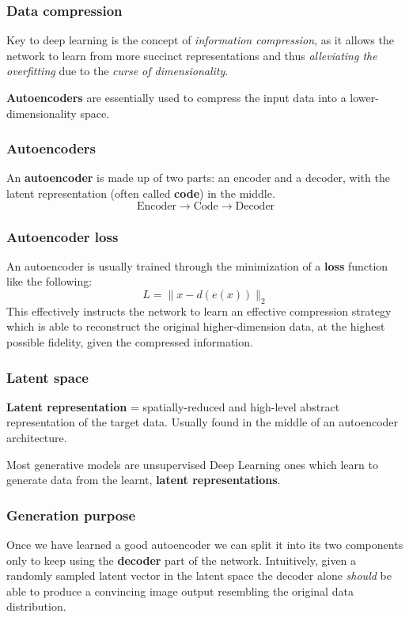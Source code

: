 \begin{frame}
    \frametitle{Data compression}
    Key to deep learning is the concept of \emph{information compression}, as it allows the network to learn from more succinct representations and thus \emph{alleviating the overfitting} due to the \emph{curse of dimensionality}.

    \textbf{Autoencoders} are essentially used to compress the input data into a lower-dimensionality space.
\end{frame}

\begin{frame}
    \frametitle{Autoencoders}
    An \textbf{autoencoder} is made up of two parts: an encoder and a decoder, with the latent representation (often called \textbf{code}) in the middle.
    $$\text{Encoder} \to \text{Code} \to \text{Decoder}$$
\end{frame}

\begin{frame}
    \frametitle{Autoencoder loss}
    An autoencoder is usually trained through the minimization of a \textbf{loss} function like the following:
    $$L=\lVert x - d(e(x)) \rVert_2$$
    This effectively instructs the network to learn an effective compression strategy which is able to reconstruct the original higher-dimension data, at the highest possible fidelity, given the compressed information.
\end{frame}

\begin{frame}
    \frametitle{Latent space}
    \textbf{Latent representation} = spatially-reduced and high-level abstract representation of the target data. Usually found in the middle of an autoencoder architecture.

    Most generative models are unsupervised Deep Learning ones which learn to generate data from the learnt, \textbf{latent representations}.
\end{frame}

\begin{frame}
    \frametitle{Generation purpose}
    Once we have learned a good autoencoder we can split it into its two components only to keep using the \textbf{decoder} part of the network. Intuitively, given a randomly sampled latent vector in the latent space the decoder alone \emph{should} be able to produce a convincing image output resembling the original data distribution.
\end{frame}

